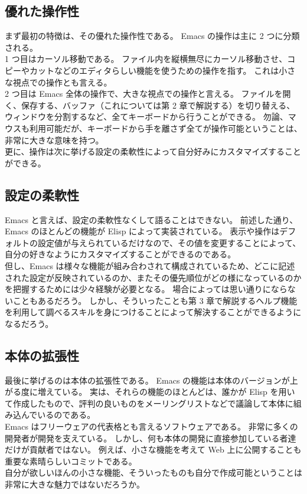 \subsection{優れた操作性}
まず最初の特徴は、その優れた操作性である。
Emacs の操作は主に 2 つに分類される。\\

1 つ目はカーソル移動である。
ファイル内を縦横無尽にカーソル移動させ、コピーやカットなどのエディタらしい機能を使うための操作を指す。
これは小さな視点での操作とも言える。\\

2 つ目は Emacs 全体の操作で、大きな視点での操作と言える。
ファイルを開く、保存する、バッファ（これについては第 2 章で解説する）を切り替える、ウィンドウを分割するなど、全てキーボードから行うことができる。
勿論、マウスも利用可能だが、キーボードから手を離さず全てが操作可能ということは、非常に大きな意味を持つ。\\

更に、操作は次に挙げる設定の柔軟性によって自分好みにカスタマイズすることができる。
\subsection{設定の柔軟性}
Emacs と言えば、設定の柔軟性なくして語ることはできない。
前述した通り、Emacs のほとんどの機能が Elisp によって実装されている。
表示や操作はデフォルトの設定値が与えられているだけなので、その値を変更することによって、自分の好きなようにカスタマイズすることができるのである。\\

但し、Emacs は様々な機能が組み合わされて構成されているため、どこに記述された設定が反映されているのか、またその優先順位がどの様になっているのかを把握するためには少々経験が必要となる。
場合によっては思い通りにならないこともあるだろう。
しかし、そういったことも第 3 章で解説するヘルプ機能を利用して調べるスキルを身につけることによって解決することができるようになるだろう。
\subsection{本体の拡張性}
最後に挙げるのは本体の拡張性である。
Emacs の機能は本体のバージョンが上がる度に増えている。
実は、それらの機能のほとんどは、誰かが Elisp を用いて作成したもので、評判の良いものをメーリングリストなどで議論して本体に組み込んでいるのである。\\

Emacs はフリーウェアの代表格とも言えるソフトウェアである。
非常に多くの開発者が開発を支えている。
しかし、何も本体の開発に直接参加している者達だけが貢献者ではない。
例えば、小さな機能を考えて Web 上に公開することも重要な素晴らしいコミットである。\\

自分が欲しいほんの小さな機能、そういったものも自分で作成可能ということは非常に大きな魅力ではないだろうか。
